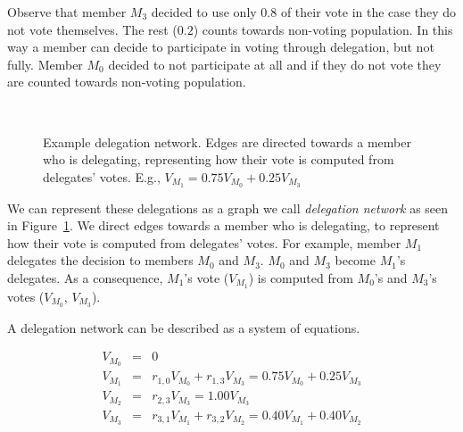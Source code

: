 \documentclass{sigchi}
\begin{document}
Observe that member $M_3$ decided to use only $0.8$ of their vote in the case they do not vote themselves.
The rest ($0.2$) counts towards non-voting population.
In this way a member can decide to participate in voting through delegation, but not fully.
Member $M_0$ decided to not participate at all and if they do not vote they are counted towards non-voting population.

\begin{figure}
  \centering
  \caption{Example delegation network. Edges are directed towards a member who is delegating, representing how their
  vote is computed from delegates' votes. E.g., $V_{M_1} = 0.75 V_{M_0} + 0.25 V_{M_3}$}~\label{fig:delegation-network}
\end{figure}

We can represent these delegations as a graph we call \emph{delegation network} as seen in
Figure~\ref{fig:delegation-network}.
We direct edges towards a member who is delegating, to represent how their vote is computed from delegates' votes.
For example, member $M_1$ delegates the decision to members $M_0$ and $M_3$.
$M_0$ and $M_3$ become $M_1$'s delegates.
As a consequence, $M_1$'s vote ($V_{M_1}$) is computed from $M_0$'s and $M_3$'s votes ($V_{M_0}$, $V_{M_3}$).

A delegation network can be described as a system of equations.

\begin{displaymath}
\begin{array}{rcl}
V_{M_0} & = & 0 \\
V_{M_1} & = & r_{1,0} V_{M_0} + r_{1,3} V_{M_3} = 0.75 V_{M_0} + 0.25 V_{M_3} \\
V_{M_2} & = & r_{2,3} V_{M_3} = 1.00 V_{M_3} \\
V_{M_3} & = & r_{3,1} V_{M_1} + r_{3,2} V_{M_2} = 0.40 V_{M_1} + 0.40 V_{M_2} \\
\end{array}
\end{displaymath}
\end{document}
